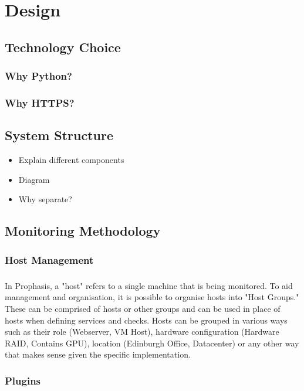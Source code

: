 \documentclass[bsc,logo,twoside]{infthesis}
\begin{document}
	
\chapter{Design}
\section{Technology Choice}
\subsection{Why Python?}
\subsection{Why HTTPS?}

\section{System Structure}
\begin{itemize}
	\item Explain different components
	\item Diagram
	\item Why separate?
\end{itemize}

\section{Monitoring Methodology}
\subsection{Host Management}
\paragraph*{}
	In Prophasis, a "host" refers to a single machine that is being monitored.
	To aid management and organisation, it is possible to organise hosts into
	"Host Groups."  These can be comprised of hosts or other groups and can be
	used in place of hosts when defining services and checks.  Hosts can be
	grouped in various ways such as their role (Webserver, VM Host), hardware
	configuration (Hardware RAID, Contains GPU), location (Edinburgh Office,
	Datacenter) or any other way that makes sense given the specific
	implementation.

\subsection{Plugins}
\end{document}

